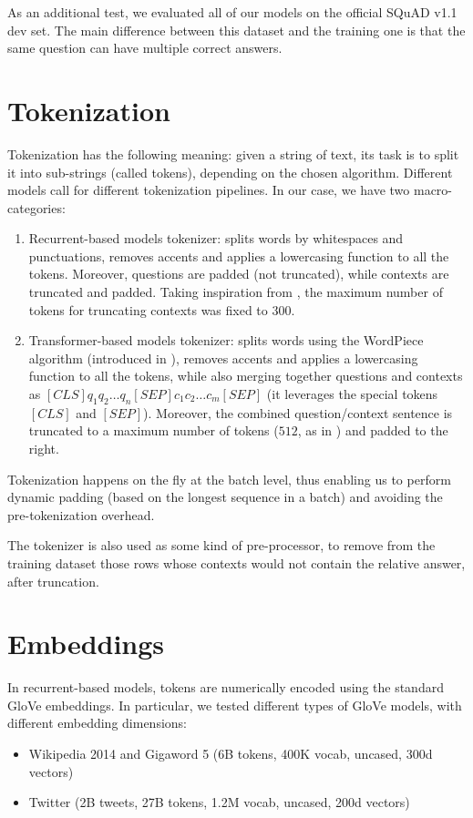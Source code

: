 \documentclass[a4paper,10pt]{report}
\begin{document}
As an additional test, we evaluated all of our models on the official SQuAD v1.1 dev set. The main difference between this dataset and the training one is that the same question can have multiple correct answers.

\section{Tokenization}
Tokenization has the following meaning: given a string of text, its task is to split it into sub-strings (called tokens), depending on the chosen algorithm. Different models call for different tokenization pipelines. In our case, we have two macro-categories:
\begin{enumerate}
  \item Recurrent-based models tokenizer: splits words by whitespaces and punctuations, removes accents and applies a lowercasing function to all the tokens. Moreover, questions are padded (not truncated), while contexts are truncated and padded. Taking inspiration from \cite{max-context-tokens}, the maximum number of tokens for truncating contexts was fixed to $300$. 
  \item Transformer-based models tokenizer: splits words using the WordPiece algorithm (introduced in \cite{wordpiece}), removes accents and applies a lowercasing function to all the tokens, while also merging together questions and contexts as $[CLS] q_1 q_2 \dots q_n [SEP] c_1 c_2 \dots c_m [SEP]$ (it leverages the special tokens $[CLS]$ and $[SEP]$). Moreover, the combined question/context sentence is truncated to a maximum number of tokens ($512$, as in \cite{bert}) and padded to the right.
\end{enumerate} 
Tokenization happens on the fly at the batch level, thus enabling us to perform dynamic padding (based on the longest sequence in a batch) and avoiding the pre-tokenization overhead.

The tokenizer is also used as some kind of pre-processor, to remove from the training dataset those rows whose contexts would not contain the relative answer, after truncation. 

\section{Embeddings}
In recurrent-based models, tokens are numerically encoded using the standard GloVe embeddings. In particular, we tested different types of GloVe models, with different embedding dimensions:
\begin{itemize}
  \item Wikipedia 2014 and Gigaword 5 (6B tokens, 400K vocab, uncased, 300d vectors)
  \item Twitter (2B tweets, 27B tokens, 1.2M vocab, uncased, 200d vectors)
\end{itemize}
\end{document}
